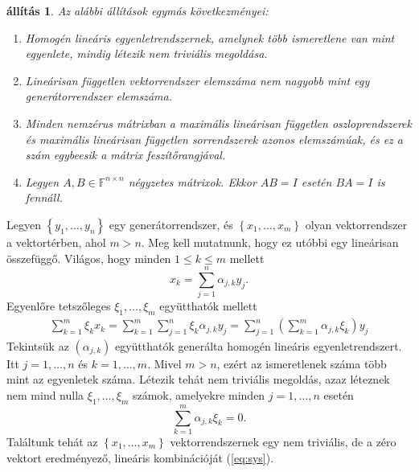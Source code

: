 \documentclass[9pt,showtrims]{memoir}
\makeatletter
\renewenvironment{proof}[1][\proofname]
    {\par\pushQED{\qed}%
    \normalfont \topsep6\p@\@plus6\p@\relax
    \trivlist
    \item[\hskip\labelsep
        \itshape
    #1\@addpunct{:}]\ignorespaces}
    {\popQED\endtrivlist\@endpefalse}
\theoremstyle{plain}
\newtheorem{proposition}{állítás}[chapter]
\theoremstyle{remark}
\theoremstyle{definition}
\makeatother
\begin{document}
\begin{proposition}
    Az alábbi állítások egymás következményei:
    \begin{enumerate}
        \item Homogén lineáris egyenletrendszernek, amelynek több ismeretlene van mint egyenlete,
            mindig létezik nem triviális megoldása.
        \item Lineárisan független vektorrendszer elemszáma nem nagyobb mint egy generátorrendszer elemszáma.
        \item Minden nemzérus mátrixban 
            a maximális lineárisan független oszloprendszerek 
            és maximális lineárisan független sorrendszerek azonos elemszámúak, 
            és ez a szám egybeesik a mátrix feszítőrangjával.
        \item
            Legyen $A,B\in\mathbb{F}^{n\times n}$ négyzetes mátrixok.
            Ekkor $AB=I$ esetén $BA=I$ is fennáll.\qedhere
    \end{enumerate}
\end{proposition}
\begin{proof}[1. \Rightarrow 2.]
    Legyen $\left\{ y_1,\dots,y_n \right\}$ egy generátorrendszer,
    és $\left\{ x_1,\dots,x_m \right\}$ olyan vektorrendszer a vektortérben, ahol $m>n$.
    Meg kell mutatnunk, hogy ez utóbbi egy lineárisan összefüggő.
    Világos, hogy minden $1\leq k\leq m$ mellett
    \[
        x_k=\sum_{j=1}^n\alpha_{j,k}y_j.
    \]
    Egyenlőre tetszőleges $\xi_1,\dots,\xi_m$ együtthatók mellett
    \begin{eqnarray}
        \sum_{k=1}^m\xi_kx_k=
        \sum_{k=1}^m\sum_{j=1}^n\xi_k\alpha_{j,k}y_j=
        \sum_{j=1}^n\left( \sum_{k=1}^m\alpha_{j,k}\xi_k \right)y_j
        \label{eq:sys}
    \end{eqnarray}
    Tekintsük az $\left( \alpha_{j,k} \right)$ együtthatók generálta
    homogén lineáris egyenletrendszert. 
    Itt $j=1,\dots,n$ és $k=1,\dots,m$.
    Mivel $m>n$, ezért az ismeretlenek száma több mint az egyenletek száma.
    Létezik tehát nem triviális megoldás, azaz léteznek nem mind nulla
    $\xi_1,\dots,\xi_m$ számok, amelyekre minden $j=1,\dots,n$ esetén
    \[
        \sum_{k=1}^m\alpha_{j,k}\xi_k=0.
    \]
    Találtunk tehát az $\left\{ x_1,\dots,x_m \right\}$ vektorrendszernek egy
    nem triviális, 
    de a zéro vektort eredményező,
    lineáris kombinációját (\ref{eq:sys}).
\end{proof}
\end{document}
